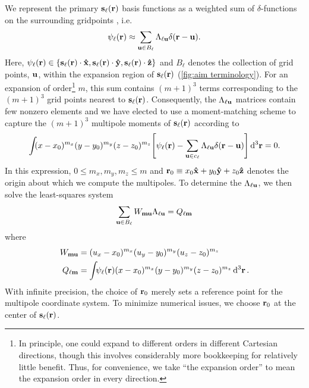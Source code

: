 We represent the primary $\vb{s}_\ell(\vb{r})$ basis functions as a weighted sum of $\delta$-functions on the surrounding gridpoints , i.e.
\begin{equation}
  \psi_\ell(\vb{r}) \approx \sum_{\vb{u} \in B_{\ell}} \Lambda_{\ell\vb{u}} \delta(\vb{r} - \vb{u}).
  \label{eq:grid linear combination}
\end{equation}
Here, $\psi_\ell(\vb{r}) \in \qty{\vb{s}_\ell(\vb{r})\cdot \vu{x}, \vb{s}_\ell(\vb{r}) \cdot \vu{y}, \vb{s}_\ell(\vb{r}) \cdot \vu{z}}$ and $B_\ell$ denotes the collection of grid points, $\vb{u}$, within the expansion region of $\vb{s}_\ell(\vb{r})$ (\cref{fig:aim terminology}).
For an expansion of order\footnote{In principle, one could expand to different orders in different Cartesian directions, though this involves considerably more bookkeeping for relatively little benefit. Thus, for convenience, we take ``the expansion order'' to mean the expansion order in every direction.} $m$, this sum contains $(m + 1)^3$ terms corresponding to the $(m + 1)^3$ grid points nearest to $\vb{s}_\ell(\vb{r})$.
Consequently, the $\Lambda_{\ell \vb{u}}$ matrices contain few nonzero elements and we have elected to use a moment-matching scheme to capture the $(m + 1)^3$ multipole moments of $\vb{s}_\ell(\vb{r})$ according to
\begin{equation}
  \int_{} \kern0.1em (x - x_0)^{m_x}(y - y_0)^{m_y}(z - z_0)^{m_z} \qty[\psi_\ell(\vb{r}) - \sum_{\vb{u} \in c_\ell}\Lambda_{\ell\vb{u}}\delta(\vb{r} - \vb{u})] \dd[3]{\vb{r}} = 0.
  \label{eq:moment matching}
\end{equation}
In this expression, $0 \leqslant m_x, m_y, m_z \leqslant m$ and $\vb{r}_0 \equiv x_0 \vu{x} + y_0 \vu{y} + z_0\vu{z}$ denotes the origin about which we compute the multipoles.
To determine the $\Lambda_{\ell \vb{u}}$, we then solve the least-squares system
\begin{equation}
  \sum_{\vb{u} \in B_\ell} W_{\vb{m}\vb{u}}\Lambda_{\ell\vb{u}} = Q_{\ell\vb{m}}
  \label{eq:expansion matrix system}
\end{equation}
where
\begin{subequations}
  \begin{align}
    W_{\vb{m}\vb{u}} &= (u_x - x_0)^{m_x} (u_y - y_0)^{m_y} (u_z - z_0)^{m_z} \label{eq:w matrix} \\
    Q_{\ell \vb{m}} &= \int_{} \psi_\ell(\vb{r}) (x - x_0)^{m_x} (y - y_0)^{m_y} (z - z_0)^{m_z} \dd[3]{\vb{r}} \label{eq:q vector}.
  \end{align}
\end{subequations}
With infinite precision, the choice of $\vb{r}_0$ merely sets a reference point for the multipole coordinate system.
To minimize numerical issues, we choose $\vb{r}_0$ at the center of $\vb{s}_\ell(\vb{r})$.

